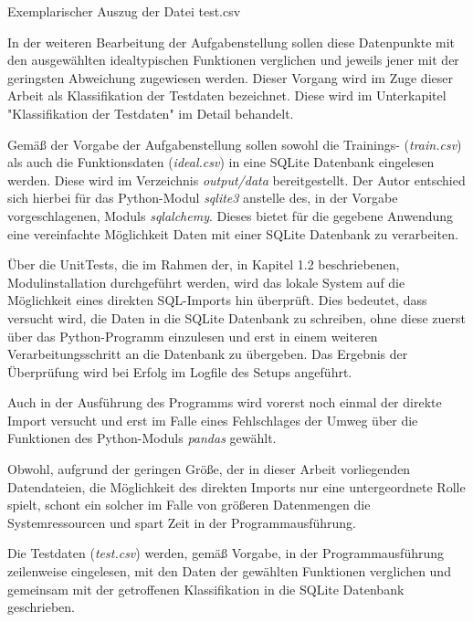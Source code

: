 \begin{table}[H]
\small
\centering
{}
\caption{Exemplarischer Auszug der Datei test.csv}
\label{tab:Exemplarischer Auszug aus test.csv}
\end{table} 

In der weiteren Bearbeitung der Aufgabenstellung sollen diese Datenpunkte mit den ausgewählten idealtypischen Funktionen verglichen und jeweils jener mit der geringsten Abweichung zugewiesen werden. Dieser Vorgang wird im Zuge dieser Arbeit als Klassifikation der Testdaten bezeichnet. Diese wird im Unterkapitel "Klassifikation der Testdaten" im Detail behandelt.

Gemäß der Vorgabe der Aufgabenstellung sollen sowohl die Trainings- (\emph{train.csv}) als auch die Funktionsdaten (\emph{ideal.csv}) in eine SQLite Datenbank eingelesen werden. Diese wird im Verzeichnis \emph{output/data} bereitgestellt. Der Autor entschied sich hierbei für das Python-Modul \emph{sqlite3} anstelle des, in der Vorgabe vorgeschlagenen, Moduls \emph{sqlalchemy}. Dieses bietet für die gegebene Anwendung eine vereinfachte Möglichkeit Daten mit einer SQLite Datenbank zu verarbeiten.

Über die UnitTests, die im Rahmen der, in Kapitel 1.2 beschriebenen, Modulinstallation durchgeführt werden, wird das lokale System auf die Möglichkeit eines direkten SQL-Imports hin überprüft. Dies bedeutet, dass versucht wird, die Daten in die SQLite Datenbank zu schreiben, ohne diese zuerst über das Python-Programm einzulesen und erst in einem weiteren Verarbeitungsschritt an die Datenbank zu übergeben. Das Ergebnis der Überprüfung wird bei Erfolg im Logfile des Setups angeführt. 

Auch in der Ausführung des Programms wird vorerst noch einmal der direkte Import versucht und erst im Falle eines Fehlschlages der Umweg über die Funktionen des Python-Moduls \emph{pandas} gewählt.

Obwohl, aufgrund der geringen Größe, der in dieser Arbeit vorliegenden Datendateien, die Möglichkeit des direkten Imports nur eine untergeordnete Rolle spielt, schont ein solcher im Falle von größeren Datenmengen die Systemressourcen und spart Zeit in der Programmausführung.

Die Testdaten (\emph{test.csv}) werden, gemäß Vorgabe, in der Programmausführung zeilenweise eingelesen, mit den Daten der gewählten Funktionen verglichen und gemeinsam mit der getroffenen Klassifikation in die SQLite Datenbank geschrieben.

